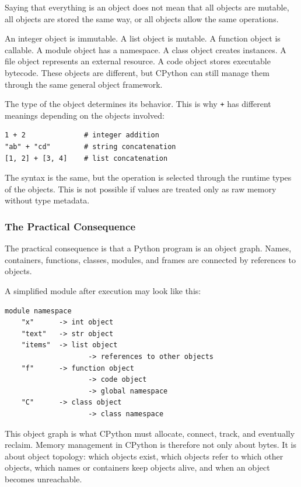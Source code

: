 Saying that everything is an object does not mean that all objects are mutable, all objects are stored the same way, or all objects allow the same operations.

An integer object is immutable. A list object is mutable. A function object is callable. A module object has a namespace. A class object creates instances. A file object represents an external resource. A code object stores executable bytecode. These objects are different, but CPython can still manage them through the same general object framework.

The type of the object determines its behavior. This is why \texttt{+} has different meanings depending on the objects involved:

\begin{verbatim}
1 + 2              # integer addition
"ab" + "cd"        # string concatenation
[1, 2] + [3, 4]    # list concatenation
\end{verbatim}

The syntax is the same, but the operation is selected through the runtime types of the objects. This is not possible if values are treated only as raw memory without type metadata.

\subsubsection*{The Practical Consequence}

The practical consequence is that a Python program is an object graph. Names, containers, functions, classes, modules, and frames are connected by references to objects.

A simplified module after execution may look like this:

\begin{verbatim}
module namespace
    "x"      -> int object
    "text"   -> str object
    "items"  -> list object
                    -> references to other objects
    "f"      -> function object
                    -> code object
                    -> global namespace
    "C"      -> class object
                    -> class namespace
\end{verbatim}

This object graph is what CPython must allocate, connect, track, and eventually reclaim. Memory management in CPython is therefore not only about bytes. It is about object topology: which objects exist, which objects refer to which other objects, which names or containers keep objects alive, and when an object becomes unreachable.

